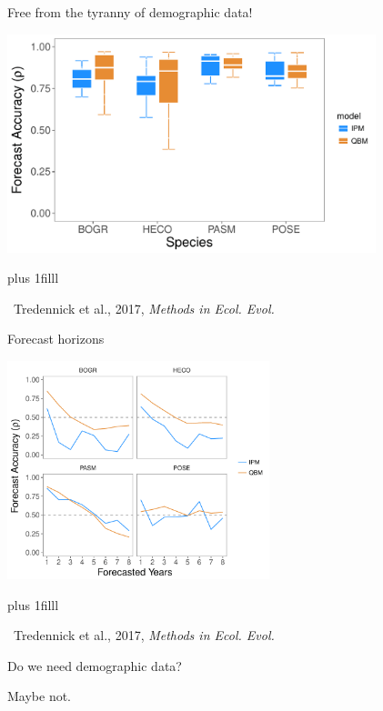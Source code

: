 \documentclass[12pt, compress, aspectratio=1610]{beamer}
\newcommand{\btVFill}{\vskip0pt plus 1filll}
\newcommand{\credit}[1]{\btVFill\par\hfill \footnotesize ~#1}
\begin{document}
\begin{frame}{%
\protect\hypertarget{free-from-the-tyranny-of-demographic-data}{%
Free from the tyranny of demographic data!}}

\centering

\includegraphics[height=2.5in]{./figures/mee_forecast_accuracy.pdf}

\credit{Tredennick et al., 2017, \emph{Methods in Ecol. Evol.}}

\end{frame}

\begin{frame}{%
\protect\hypertarget{forecast-horizons}{%
Forecast horizons}}

\centering

\includegraphics[height=2.5in]{./figures/mee_horizons.pdf}

\credit{Tredennick et al., 2017, \emph{Methods in Ecol. Evol.}}

\end{frame}

\begin{frame}{%
\protect\hypertarget{do-we-need-demographic-data-1}{%
Do we need demographic data?}}

\centering

Maybe not.

\end{frame}
\end{document}
